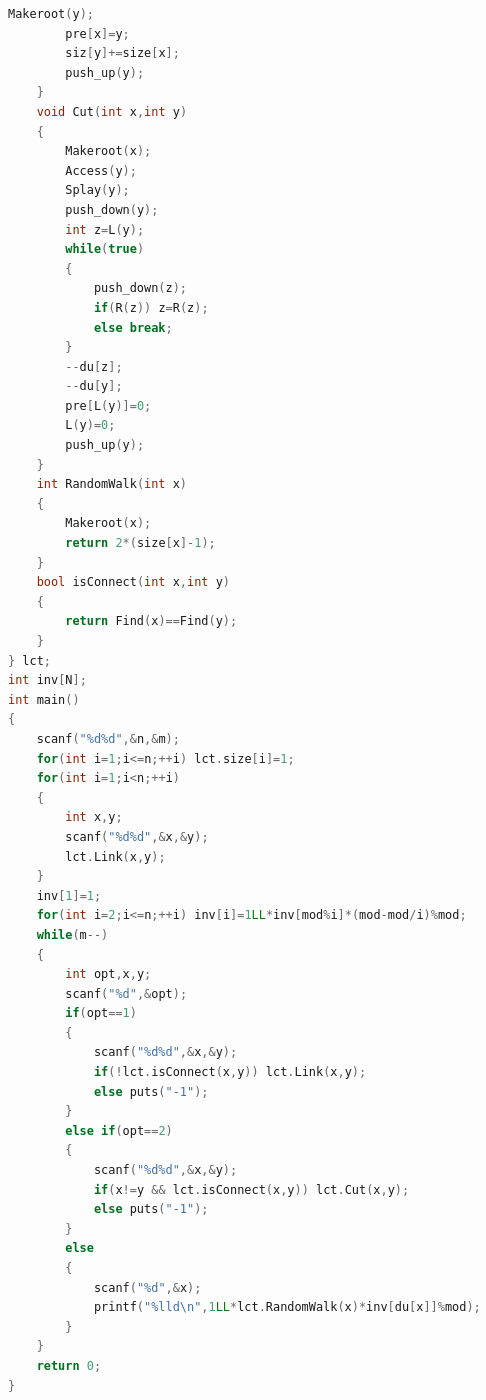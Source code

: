\documentclass[UTF8,a4paper,titlepage]{ctexart}
\begin{document}
\begin{lstlisting}[language=C++]
        Makeroot(y);
        pre[x]=y;
        siz[y]+=size[x];
        push_up(y);
    }
    void Cut(int x,int y)
    {
        Makeroot(x);
        Access(y);
        Splay(y);
        push_down(y);
        int z=L(y);
        while(true)
        {
            push_down(z);
            if(R(z)) z=R(z);
            else break;
        }
        --du[z];
        --du[y];
        pre[L(y)]=0;
        L(y)=0;
        push_up(y);
    }
    int RandomWalk(int x)
    {
        Makeroot(x);
        return 2*(size[x]-1);
    }
    bool isConnect(int x,int y)
    {
        return Find(x)==Find(y);
    }
} lct;
int inv[N];
int main()
{
    scanf("%d%d",&n,&m);
    for(int i=1;i<=n;++i) lct.size[i]=1;
    for(int i=1;i<n;++i)
    {
        int x,y;
        scanf("%d%d",&x,&y);
        lct.Link(x,y);
    }
    inv[1]=1;
    for(int i=2;i<=n;++i) inv[i]=1LL*inv[mod%i]*(mod-mod/i)%mod;
    while(m--)
    {
        int opt,x,y;
        scanf("%d",&opt);
        if(opt==1)
        {
            scanf("%d%d",&x,&y);
            if(!lct.isConnect(x,y)) lct.Link(x,y);
            else puts("-1");
        }
        else if(opt==2)
        {
            scanf("%d%d",&x,&y);
            if(x!=y && lct.isConnect(x,y)) lct.Cut(x,y);
            else puts("-1");
        }
        else
        {
            scanf("%d",&x);
            printf("%lld\n",1LL*lct.RandomWalk(x)*inv[du[x]]%mod);
        }
    }
    return 0;
}
	\end{lstlisting}
	
\end{document}
